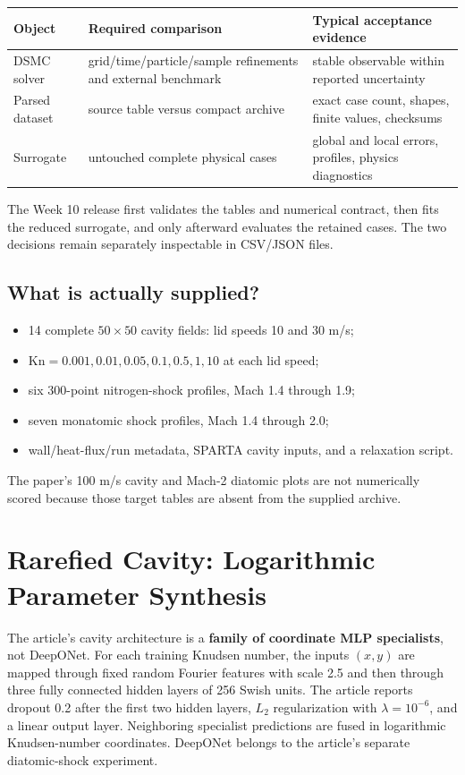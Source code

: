 \documentclass[11pt]{article}
\newcommand{\Kn}{\mathrm{Kn}}
\begin{document}
\begin{center}
\begin{tabular}{p{}p{}p{}}
\toprule
Object & Required comparison & Typical acceptance evidence \\
\midrule
DSMC solver & grid/time/particle/sample refinements and external benchmark & stable observable within reported uncertainty \\
Parsed dataset & source table versus compact archive & exact case count, shapes, finite values, checksums \\
Surrogate & untouched complete physical cases & global and local errors, profiles, physics diagnostics \\
\bottomrule
\end{tabular}
\end{center}

\begin{decisionbox}
The Week 10 release first validates the tables and numerical contract, then
fits the reduced surrogate, and only afterward evaluates the retained cases.
The two decisions remain separately inspectable in CSV/JSON files.
\end{decisionbox}

\subsection{What is actually supplied?}
\begin{itemize}
\item 14 complete $50\times50$ cavity fields: lid speeds 10 and 30 m/s;
\item $\Kn=0.001,0.01,0.05,0.1,0.5,1,10$ at each lid speed;
\item six 300-point nitrogen-shock profiles, Mach 1.4 through 1.9;
\item seven monatomic shock profiles, Mach 1.4 through 2.0;
\item wall/heat-flux/run metadata, SPARTA cavity inputs, and a relaxation script.
\end{itemize}
The paper's 100 m/s cavity and Mach-2 diatomic plots are not numerically scored
because those target tables are absent from the supplied archive.

\clearpage
\section{Rarefied Cavity: Logarithmic Parameter Synthesis}
The article's cavity architecture is a \textbf{family of coordinate MLP
specialists}, not DeepONet.  For each training Knudsen number, the inputs
$(x,y)$ are mapped through fixed random Fourier features with scale 2.5 and
then through three fully connected hidden layers of 256 Swish units.  The
article reports dropout 0.2 after the first two hidden layers, $L_2$
regularization with $\lambda=10^{-6}$, and a linear output layer.  Neighboring
specialist predictions are fused in logarithmic Knudsen-number coordinates.
DeepONet belongs to the article's separate diatomic-shock experiment.
\end{document}
